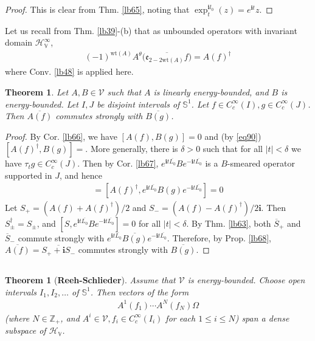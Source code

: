 \documentclass[12pt,b5paper,notitlepage]{article}
\theoremstyle{definition}
\theoremstyle{plain}
\newtheorem{thm}[df]{Theorem}
\newcommand{\mc}{\mathcal}
\newcommand{\ovl}{\overline}
\newcommand{\im}{\mathbf{i}}
\newcommand{\Zbb}{\mathbb Z}
\newcommand{\wt}{\mathrm{wt}}
\newcommand{\Sbb}{{\mathbb S}}
\newcommand{\HV}{\mathcal H_{\mathbb V}}
\newcommand{\ek}{\mathfrak{e}}
\numberwithin{equation}{section}
\begin{document}
\begin{proof}
This is clear from Thm. \ref{lb65}, noting that $\exp^{\im l_0}_t(z)=e^{\im t}z$.
\end{proof}


Let us recall from Thm. \ref{lb39}-(b) that as unbounded operators with invariant domain $\HV^\infty$, 
\begin{align}\label{eq90}
(-1)^{\wt(A)}A^\theta\big(\ovl{\ek_{2-2\wt(A)}f}\big)=A(f)^\dagger
\end{align}
where Conv. \ref{lb48} is applied here.

\begin{thm}\label{lb108}
Let $A,B\in\mc V$ such that $A$ is linearly energy-bounded, and $B$ is energy-bounded. Let $I,J$ be disjoint intervals of $\Sbb^1$. Let $f\in C_c^\infty(I),g\in C_c^\infty(J)$. Then $\ovl{A(f)}$ commutes strongly with $\ovl{B(g)}$. 
\end{thm}


\begin{proof}
By Cor. \ref{lb66}, we have $[A(f),B(g)]=0$ and (by \eqref{eq90}) $[A(f)^\dagger,B(g)]=$. More generally, there is $\delta>0$ such that for all $|t|<\delta$ we have $\tau_tg\in C_c^\infty(J)$. Then by Cor. \ref{lb67}, $e^{\im t\ovl{L_0}}Be^{-\im t\ovl{L_0}}$ is a $B$-smeared operator supported in $J$, and hence
\begin{align*}
[A(f),e^{\im t\ovl{L_0}}B(g)e^{-\im t\ovl{L_0}}]=[A(f)^\dagger,e^{\im t\ovl{L_0}}B(g)e^{-\im t\ovl{L_0}}]=0
\end{align*} 
Let $S_+=(A(f)+A(f)^\dagger)/2$ and $S_-=(A(f)-A(f)^\dagger)/2\im$. Then $S_\pm^\dagger=S_\pm$, and $[S,e^{\im t\ovl{L_0}}Be^{-\im t\ovl{L_0}}]=0$ for all $|t|<\delta$. By Thm. \ref{lb63}, both $\ovl S_+$ and $\ovl S_-$ commute strongly with $e^{\im t\ovl{L_0}}\ovl{B(g)}e^{-\im t\ovl{L_0}}$. Therefore, by Prop. \ref{lb68}, $\ovl{A(f)}=\ovl{S_++\im S_-}$ commutes strongly with $\ovl{B(g)}$.
\end{proof}



\subsection{}


\begin{thm}[\textbf{Reeh-Schlieder}]\label{lb70}
Assume that $\mc V$ is energy-bounded. Choose open intervals $I_1,I_2,\dots$ of $\Sbb^1$. Then vectors of the form
\begin{align}\label{eq91}
A^1(f_1)\cdots A^N(f_N)\Omega
\end{align}
(where $N\in\Zbb_+$, and $A^i\in\mc V,f_i\in C_c^\infty(I_i)$ for each $1\leq i\leq N$) span a dense subspace of $\HV$.
\end{thm}
\end{document}
